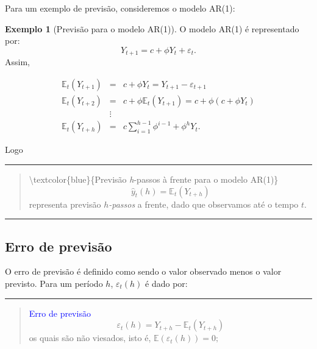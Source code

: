 \documentclass[
]{book}
\theoremstyle{definition}
\theoremstyle{definition}
\newtheorem{example}{Exemplo}[chapter]
\theoremstyle{definition}
\theoremstyle{remark}
\begin{document}
Para um exemplo de previsão, consideremos o modelo AR(1):

\begin{example}[Previsão para o modelo AR(1)]
\protect\hypertarget{exm:prevar1}{}{\label{exm:prevar1} {} }O modelo AR(1) é representado por:
\[Y_{t+1}=c+\phi Y_t+\varepsilon_t.\]
Assim,

\begin{eqnarray*}
 \mathbb{E}_t(Y_{t+1})&=&c+\phi Y_t=Y_{t+1}-\varepsilon_{t+1}\\
 \mathbb{E}_t(Y_{t+2})&=&c+\phi \mathbb{E}_t(Y_{t+1})=c+\phi(c+\phi Y_t)\\
 &\vdots&\\
  \mathbb{E}_t(Y_{t+h})&=&c\sum_{i=1}^{h-1}\phi^{i-1}+\phi^h Y_t.
\end{eqnarray*}
\end{example}

Logo

\begin{center}\rule{0.5\linewidth}{0.5pt}\end{center}

\begin{quote}
\textbackslash textcolor\{blue\}\{Previsão \emph{h}-passos à frente para o modelo AR(1)\}
\[\hat{y}_t(h)=\mathbb{E}_t(Y_{t+h})\]
representa previsão \emph{$h$-passos} a frente, dado que observamos até o tempo \(t\).
\end{quote}

\begin{center}\rule{0.5\linewidth}{0.5pt}\end{center}

\hypertarget{erro-de-previsuxe3o}{%
\subsection{Erro de previsão}\label{erro-de-previsuxe3o}}

O erro de previsão é definido como sendo o valor observado menos o valor previsto. Para um período \(h\),
\(\varepsilon_t(h)\) é dado por:

\begin{center}\rule{0.5\linewidth}{0.5pt}\end{center}

\begin{quote}
\textcolor{blue}{Erro de previsão}
\[\varepsilon_t(h) = Y_{t+h}-\mathbb{E}_t(Y_{t+h}) \]
os quais são não viesados, isto é, \(\mathbb{E}(\varepsilon_t(h))=0;\)
\end{quote}
\end{document}
